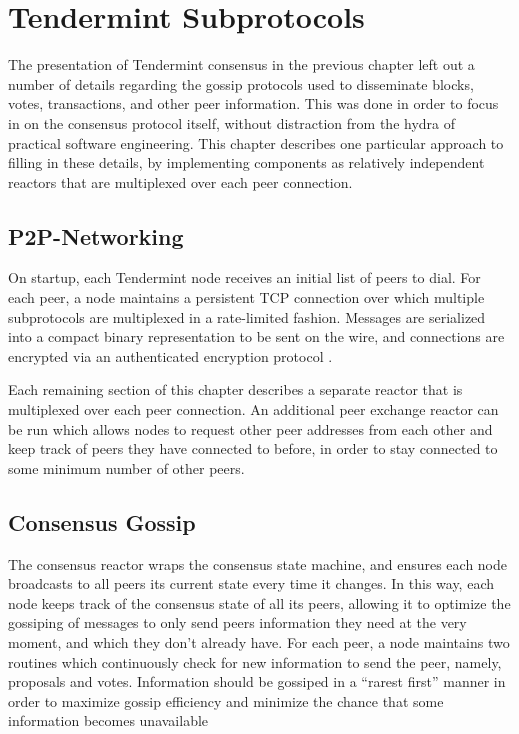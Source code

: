 \chapter{Tendermint Subprotocols}
\label{ch:subprotocols}

The presentation of Tendermint consensus in the previous chapter left out a number of details
regarding the gossip protocols used to disseminate blocks, votes, transactions, 
and other peer information. 
This was done in order to focus in on the consensus protocol itself, 
without distraction from the hydra of practical software engineering.
This chapter describes one particular approach to filling in these details,
by implementing components as relatively independent reactors that are multiplexed over each peer connection.

\section{P2P-Networking}

On startup, each Tendermint node receives an initial list of peers to dial.
For each peer, a node maintains a persistent TCP connection over which multiple subprotocols are multiplexed in a rate-limited fashion.
Messages are serialized into a compact binary representation to be sent on the wire, and 
connections are encrypted via an authenticated encryption protocol \cite{authenticated_encryption}.

Each remaining section of this chapter describes a separate reactor that is multiplexed over each peer connection.
An additional peer exchange reactor can be run which allows nodes to request other peer addresses from each other and keep track of peers they have connected to before,
in order to stay connected to some minimum number of other peers.

\section{Consensus Gossip}

The consensus reactor wraps the consensus state machine, 
and ensures each node broadcasts to all peers its current state every time it changes.
In this way, each node keeps track of the consensus state of all its peers, 
allowing it to optimize the gossiping of messages to only send peers information they need at the very moment,
and which they don't already have.
For each peer, a node maintains two routines which continuously check for new information to send the peer,
namely, proposals and votes. 
Information should be gossiped in a ``rarest first'' manner in order to maximize 
gossip efficiency and minimize the chance that some information becomes unavailable \cite{rarest_first}



